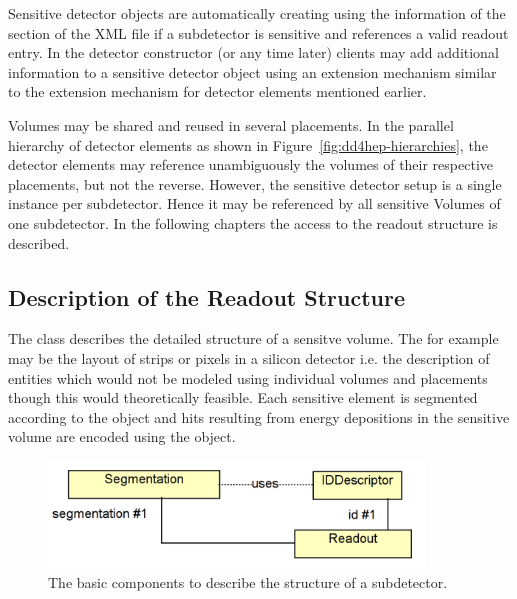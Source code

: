 \documentclass[10pt,a4paper]{article}
\begin{document}
\noindent
Sensitive detector objects are automatically creating using the information
of the  section of the XML file if a subdetector is sensitive
and references a valid readout entry.
In the detector constructor (or any time later) clients 
may add additional information to a sensitive detector object using 
an extension mechanism similar to the extension mechanism for 
detector elements mentioned earlier.


\noindent
Volumes may be shared and reused in several placements. In the parallel
hierarchy of detector elements as shown in Figure~\ref{fig:dd4hep-hierarchies},
the detector elements may reference unambiguously the volumes of their 
respective placements, but not the reverse.
However, the sensitive detector setup is a single instance per subdetector.
Hence it may be referenced by all sensitive Volumes of one subdetector.
In the following chapters the access to the readout structure is described.

\subsection{Description of the Readout Structure}
\label{sec:dd4hep-manual-readout-description}
\noindent
The  class describes the detailed structure of a sensitve volume.
The for example may be the layout of strips or pixels in a silicon detector
i.e. the description of entities which would not be modeled using individual
volumes and placements though this would theoretically  feasible.
Each sensitive element is segmented according to the  object 
and hits resulting from energy depositions in the sensitive volume are 
encoded using the  object.

\begin{figure}[h]
  \begin{center}
    \includegraphics[width=100mm] {DD4hep-readout}
    \caption{The basic components to describe the  structure
    of a subdetector. }
    \label{fig:dd4hep-sensitive-detectors}
  \end{center}
  \vspace{-0.6cm}
\end{figure}
\end{document}
